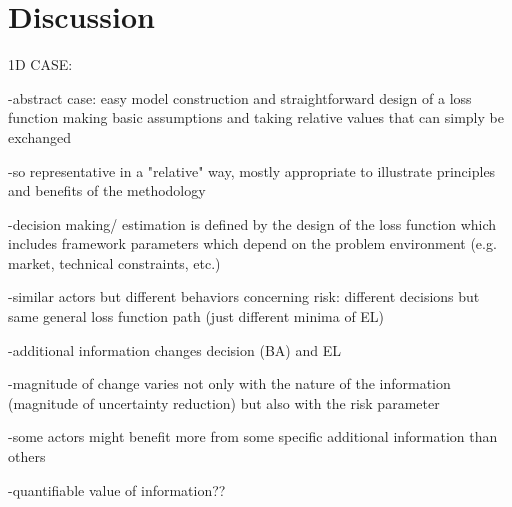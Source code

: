 	\chapter{Discussion}\label{cha:discussion}
	
	1D CASE:
	
				-abstract case: easy model construction and straightforward design of a loss function making basic assumptions and taking relative values that can simply be exchanged
			
				-so representative in a "relative" way, mostly appropriate to illustrate principles and benefits of the methodology
				
				-decision making/ estimation is defined by the design of the loss function which includes framework parameters which depend on the problem environment (e.g. market, technical constraints, etc.)
			
				-similar actors but different behaviors concerning risk: different decisions but same general loss function path (just different minima of EL)
			
				-additional information changes decision (BA) and EL
			
				-magnitude of change varies not only with the nature of the information (magnitude of uncertainty reduction) but also with the risk parameter
			
				-some actors might benefit more from some specific additional information than others
			
				-quantifiable value of information??